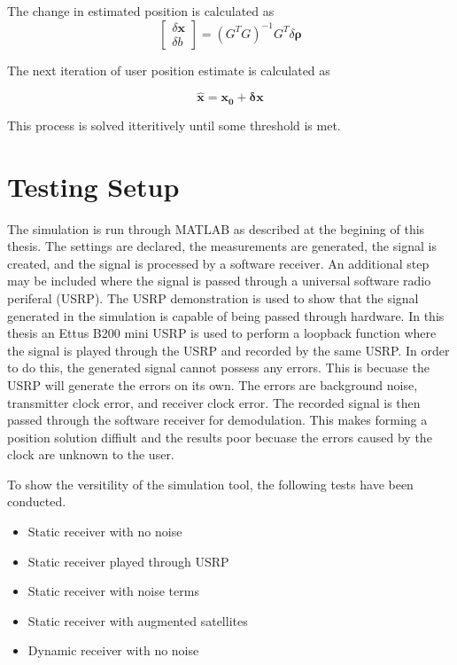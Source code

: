 \documentclass[12pt]{report}
\begin{document}
The change in estimated position is calculated as 
\begin{equation}
    \begin{bmatrix}
        \delta \mathbf{x} \\
        \delta b
    \end{bmatrix}
    = (G^TG)^{-1}G^T\delta \mathbf{\rho}
\end{equation}

The next iteration of user position estimate is calculated as 

\begin{equation}
\hat{\mathbf{x}} = \mathbf{x_0} + \mathbf{\delta x}
\end{equation}

This process is solved itteritively until some threshold is met.

\section{Testing Setup}
The simulation is run through MATLAB as described at the begining of this thesis. The settings are declared, the measurements are generated, the signal is created, and the signal is processed by a software receiver. An additional step may be included where the signal is passed through a universal software radio periferal (USRP). The USRP demonstration is used to show that the signal generated in the simulation is capable of being passed through hardware. In this thesis an Ettus B200 mini USRP is used to perform a loopback function where the signal is played through the USRP and recorded by the same USRP. In order to do this, the generated signal cannot possess any errors. This is becuase the USRP will generate the errors on its own. The errors are background noise, transmitter clock error, and receiver clock error. The recorded signal is then passed through the software receiver for demodulation. This makes forming a position solution diffiult and the results poor becuase the errors caused by the clock are unknown to the user. 

To show the versitility of the simulation tool, the following tests have been conducted.

\begin{itemize}
    \item Static receiver with no noise
    \item Static receiver played through USRP
    \item Static receiver with noise terms
    \item Static receiver with augmented satellites
    \item Dynamic receiver with no noise
\end{itemize}
\end{document}
